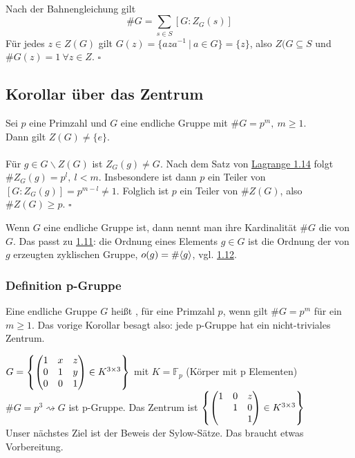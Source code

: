 \\
Nach der Bahnengleichung gilt \[\#G=\sum_{s\in S}[G:Z_G(s)] \]
Für jedes $z\in Z(G)$ gilt $G(z)=\{aza^{-1}~|~a\in G \}=\{z\}$, also $Z(G\subseteq S$ und $\#G(z)=1~\forall z\in Z$.
\hfill $\square$


\subsection{Korollar über das Zentrum}
\label{sub:kor_zentrum}
Sei $p$ eine Primzahl und $G$ eine endliche Gruppe mit $\#G=p^m,~m\ge 1$.\\
Dann gilt $Z(G)\not= \{e\}$.\\

\\
Für $g\in G\backslash Z(G)$ ist $Z_G(g)\not= G$. Nach dem Satz von \hyperref[sub:satz_von_lagrange]{Lagrange 1.14} folgt $\#Z_G(g)=p^l,~l<m$. Insbesondere ist dann $p$ ein Teiler von $[G:Z_G(g)]=p^{m-l}\not=1$. Folglich ist $p$ ein Teiler von $\#Z(G)$, also $\#Z(G)\ge p$.
\hfill $\square$

Wenn $G$ eine endliche Gruppe ist, dann nennt man ihre Kardinalität $\#G$ die  von $G$. Das passt zu \hyperref[sub:def_zyklische_gruppen]{1.11}: die Ordnung eines Elements $g\in G$ ist die Ordnung der von $g$ erzeugten zyklischen Gruppe, $o(g)=\#\langle g \rangle$, vgl. \hyperref[sub:zyklische_gruppen]{1.12}.

\subsubsection*{Definition p-Gruppe}
Eine endliche Gruppe $G$ heißt , für eine Primzahl $p$, wenn gilt $\#G=p^m$ für ein $m\ge 1$. Das vorige Korollar besagt also: jede p-Gruppe hat ein nicht-triviales Zentrum.

$G=\left\{\begin{pmatrix}
1&x&z\\ 0&1&y\\ 0&0&1 \end{pmatrix} \in K^{3\times 3}\right\}$ mit $K=\mathds{F}_p$ (Körper mit p Elementen)\\
$\#G=p^3 \rightsquigarrow G$ ist p-Gruppe. Das Zentrum ist $\left\{\begin{pmatrix}1&0&z\\&1&0\\&&1\end{pmatrix} \in K^{3\times 3}\right\}$\\
Unser nächstes Ziel ist der Beweis der Sylow-Sätze. Das braucht etwas Vorbereitung.

